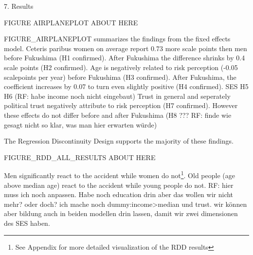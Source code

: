 {%



7. Results 

FIGURE AIRPLANEPLOT ABOUT HERE

FIGURE_AIRPLANEPLOT summarizes the findings from the fixed effects model. Ceteris paribus women on average report 0.73 more scale points then men before Fukushima (H1 confirmed). After Fukushima the difference shrinks by 0.4 scale points (H2 confirmed). 
Age is negatively related to risk perception (-0.05 scalepoints per year) before Fukushima (H3 confirmed). After Fukushima, the coefficient increases by 0.07 to turn even slightly positive (H4 confirmed). 
SES H5 H6 (RF: habe income noch nicht eingebaut)
Trust in general and seperately political trust negatively attribute to risk perception (H7 confirmed). However these effects do not differ before and after Fukushima (H8 ??? RF: finde wie gesagt nicht so klar, was man hier erwarten würde)

The Regression Discontinuity Design supports the majority of these findings. 

FIGURE_RDD_ALL_RESULTS ABOUT HERE

Men significantly react to the accident while women do not\footnote{See Appendix for more detailed visualization of the RDD results}. Old people (age above median age) react to the accident while young people do not. RF: hier muss ich noch anpassen. Habe noch education drin aber das wollen wir nicht mehr? oder doch? ich mache noch dummy:income>median und trust. wir können aber bildung auch in beiden modellen drin lassen, damit wir zwei dimensionen des SES haben.


}
